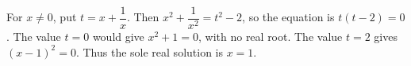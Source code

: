 For $x\ne0$, put $t=x+\dfrac{1}{x}$. Then $x^2+\dfrac{1}{x^2}=t^2-2$, so the equation is $t(t-2)=0$. The value $t=0$ would give $x^2+1=0$, with no real root. The value $t=2$ gives $(x-1)^2=0$. Thus the sole real solution is $\boxed{x=1}$.
